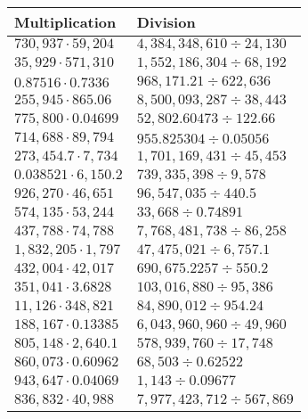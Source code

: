 \begin{longtable}[]{@{}ll@{}}
\toprule
Multiplication & Division\tabularnewline
\midrule
\endhead
\(730,937\cdot59,204\) & \(4,384,348,610÷24,130\)\tabularnewline
\(35,929\cdot571,310\) & \(1,552,186,304÷68,192\)\tabularnewline
\(0.87516\cdot0.7336\) & \(968,171.21÷622,636\)\tabularnewline
\(255,945\cdot865.06\) & \(8,500,093,287÷38,443\)\tabularnewline
\(775,800\cdot0.04699\) & \(52,802.60473÷122.66\)\tabularnewline
\(714,688\cdot89,794\) & \(955.825304÷0.05056\)\tabularnewline
\(273,454.7\cdot7,734\) & \(1,701,169,431÷45,453\)\tabularnewline
\(0.038521\cdot6,150.2\) & \(739,335,398÷9,578\)\tabularnewline
\(926,270\cdot46,651\) & \(96,547,035÷440.5\)\tabularnewline
\(574,135\cdot53,244\) & \(33,668÷0.74891\)\tabularnewline
\(437,788\cdot74,788\) & \(7,768,481,738÷86,258\)\tabularnewline
\(1,832,205\cdot1,797\) & \(47,475,021÷6,757.1\)\tabularnewline
\(432,004\cdot42,017\) & \(690,675.2257÷550.2\)\tabularnewline
\(351,041\cdot3.6828\) & \(103,016,880÷95,386\)\tabularnewline
\(11,126\cdot348,821\) & \(84,890,012÷954.24\)\tabularnewline
\(188,167\cdot0.13385\) & \(6,043,960,960÷49,960\)\tabularnewline
\(805,148\cdot2,640.1\) & \(578,939,760÷17,748\)\tabularnewline
\(860,073\cdot0.60962\) & \(68,503÷0.62522\)\tabularnewline
\(943,647\cdot0.04069\) & \(1,143÷0.09677\)\tabularnewline
\(836,832\cdot40,988\) & \(7,977,423,712÷567,869\)\tabularnewline
\bottomrule
\end{longtable}
